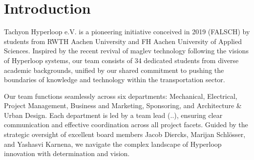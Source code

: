 \chapter{Introduction}

Tachyon Hyperloop e.V. is a pioneering initiative conceived in 2019 (FALSCH) by students from RWTH Aachen University and FH Aachen University of Applied Sciences. Inspired by the recent revival of maglev technology following the visions of Hyperloop systems, our team consists of 34 dedicated students from diverse academic backgrounds, unified by our shared commitment to pushing the boundaries of knowledge and technology within the transportation sector. 

Our team functions seamlessly across six  departments: Mechanical, Electrical, Project Management, Business and Marketing, Sponsoring, and Architecture \& Urban Design. Each department is led by a team lead (..), ensuring clear communication and effective coordination across all project facets. Guided by the strategic oversight of excellent board members Jacob Diercks, Marijan Schlösser, and Yashasvi Karnena, we navigate the complex landscape of Hyperloop innovation with determination and vision.
\newpage
